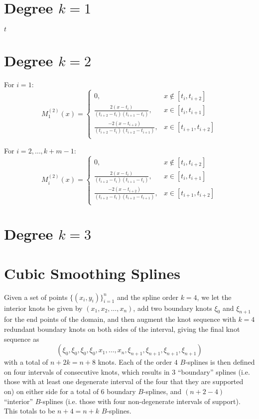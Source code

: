\documentclass{article}
\begin{document}
\section{Degree $k = 1$}

$t$

\section{Degree $k = 2$}

For $i = 1$:
\[
    M^{(2)}_1 (x) = \begin{cases}
        0 ,&  x \notin [t_i, t_{i+2}] \\
        \frac{2(x - t_i)}{(t_{i+2} - t_i)(t_{i+1} - t_i)} ,& x \in [t_i, t_{i+1}] \\
        \frac{-2(x - t_{i+2})}{(t_{i+2} - t_i)(t_{i+2} - t_{i+1})} ,& x \in [t_{i+1}, t_{i+2}] \\
    \end{cases}
\]


For $i = 2, \dots, k + m - 1$: 
\[
    M^{(2)}_i (x) = \begin{cases}
        0 ,& x \notin [t_i, t_{i+2}] \\
        \frac{2(x - t_i)}{(t_{i+2} - t_i)(t_{i+1} - t_i)} ,& x \in [t_i, t_{i+1}] \\
        \frac{-2(x - t_{i+2})}{(t_{i+2} - t_i)(t_{i+2} - t_{i+1})} ,& x \in [t_{i+1}, t_{i+2}] \\
    \end{cases}
\]

\section{Degree $k = 3$}

\section{Cubic Smoothing Splines}

Given a set of points $\{ (x_i, y_i) \}_{i=1}^n$ and the spline order $k = 4$, we let the interior knots be given by $(x_1, x_2, \dots, x_n)$, add two boundary knots $\xi_0$ and $\xi_{n+1}$ for the end points of the domain, and then augment the knot sequence with $k = 4$ redundant boundary knots on both sides of the interval, giving the final knot sequence as
\[
    (\xi_0, \xi_0, \xi_0, \xi_0, x_1, \dots, x_n, \xi_{n+1}, \xi_{n+1}, \xi_{n+1}, \xi_{n+1})
\]
with a total of $n + 2k = n + 8$ knots. Each of the order $4$ $B$-splines is then defined on four intervals of consecutive knots, which results in $3$ ``boundary'' splines (i.e. those with at least one degenerate interval of the four that they are supported on) on either side for a total of $6$ boundary $B$-splines, and $(n + 2 - 4)$ ``interior'' $B$-splines (i.e. those with four non-degenerate intervals of support). This totals to be $n + 4 = n + k$ $B$-splines. 
\end{document}
